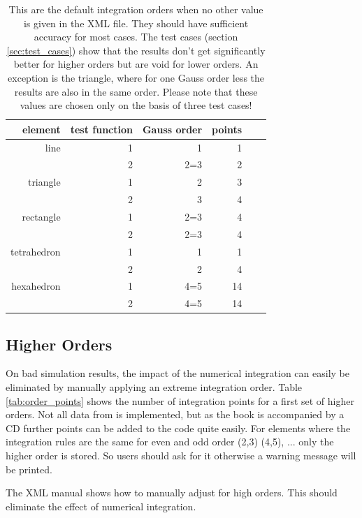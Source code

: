 \documentclass[a4paper,10pt]{article}
\begin{document}
\begin{table}
\begin{center}
\begin{tabular}{r|r|r|r|r|r}
element & test function & Gauss order & points \\
\hline
line & 1 & 1 & 1\\
     & 2 & 2=3 & 2 \\
triangle & 1 & 2 & 3 \\
         & 2 & 3 & 4 \\
rectangle & 1 & 2=3 & 4 \\
          & 2 & 2=3 & 4 \\
tetrahedron & 1 & 1 & 1 \\
         & 2 & 2 & 4 \\
hexahedron & 1 & 4=5 & 14 \\
         & 2 & 4=5 & 14 \\
\end{tabular}
\caption{This are the default integration orders when no other value is given in the
XML file. They should have sufficient accuracy for most cases. The test cases (section \ref{sec:test_cases}) show that the results don't get significantly better for higher orders but are void for lower orders. An exception is the triangle, where for one Gauss order less the results are also in the same order. Please note that these values are chosen only on the basis of three test cases!}
\label{tab:default_order}
\end{center}
\end{table}

\subsection{Higher Orders}
On bad simulation results, the impact of the numerical integration can easily be eliminated
by manually applying an extreme integration order. Table \ref{tab:order_points} shows the number of integration points for a first set of higher orders. Not all data from \cite{Solin04} is implemented, but as the book is accompanied by a CD further points can be added to the code quite easily. For elements where the integration rules are the same for even and odd order (2,3) (4,5), ... only the higher order is stored. So users should ask for it otherwise a warning message will be printed. 

The XML manual shows how to manually adjust for
high orders. This should eliminate the effect of numerical integration.
\end{document}
